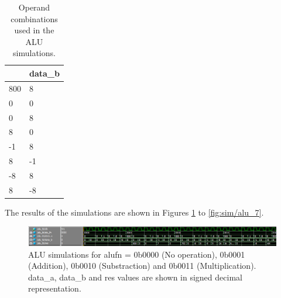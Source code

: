 \begin{table}[H]
    \centering
    \begin{tabular}{|l|l|}
    \hline
    \rowcolor[HTML]{DAE8FC} 
    \multicolumn{1}{|c|}{\cellcolor[HTML]{DAE8FC}\textbf{data\_a}} & \multicolumn{1}{c|}{\cellcolor[HTML]{DAE8FC}\textbf{data\_b}} \\ \hline
    800                                                            & 8                                                             \\ \hline
    0                                                              & 0                                                             \\ \hline
    0                                                              & 8                                                             \\ \hline
    8                                                              & 0                                                             \\ \hline
    -1                                                             & 8                                                             \\ \hline
    8                                                              & -1                                                            \\ \hline
    -8                                                             & 8                                                             \\ \hline
    8                                                              & -8                                                            \\ \hline
    \end{tabular}
    \caption{Operand combinations used in the ALU simulations.}
    \label{tab:alu/sim}
\end{table}

The results of the simulations are shown in Figures \ref{fig:sim/alu_0} to \ref{fig:sim/alu_7}.

\begin{figure}[H]
    \centering
    \includegraphics[width=\linewidth]{Chapter3-CPU/res/alu_simu_0.PNG}
    \caption{ALU simulations for alufn = 0b0000 (No operation), 0b0001 (Addition), 0b0010 (Substraction) 
    and 0b0011 (Multiplication). data\_a, data\_b and res values are shown in signed decimal 
    representation.}
    \label{fig:sim/alu_0}
\end{figure}

